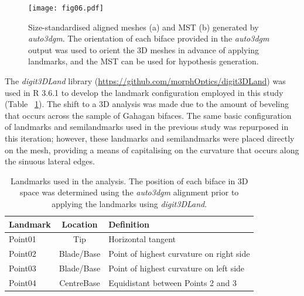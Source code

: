 \documentclass[review]{elsarticle}
\begin{document}
\begin{figure}[ht]\centering
\texttt{[image: fig06.pdf]}
\caption{Size-standardised aligned meshes (a) and MST (b) generated by \textit{auto3dgm}. The orientation of each biface provided in the \textit{auto3dgm} output was used to orient the 3D meshes in advance of applying landmarks, and the MST can be used for hypothesis generation.}
\label{fig:fig06}
\end{figure}

The \textit{digit3DLand} library (\href{https://github.com/morphOptics/digit3DLand}{https://github.com/morphOptics/digit3DLand}) was used in R 3.6.1 \citep{R} to develop the landmark configuration employed in this study (Table ~\ref{tab:Tbl1}). The shift to a 3D analysis was made due to the amount of beveling that occurs across the sample of Gahagan bifaces. The same basic configuration of landmarks and semilandmarks used in the previous study \citep[Figure 3]{RN11783} was repurposed in this iteration; however, these landmarks and semilandmarks were placed directly on the mesh, providing a means of capitalising on the curvature that occurs along the sinuous lateral edges.

\begin{table}[tbh]\centering
\footnotesize
\caption{Landmarks used in the analysis. The position of each biface in 3D space was determined using the \textit{auto3dgm} alignment prior to applying the landmarks using \textit{digit3DLand}.}
\centering
\begin{tabular}{lcp{7.5cm}}
\toprule
Landmark & Location & Definition\\
\midrule
Point01 & Tip & Horizontal tangent\\
Point02 & Blade/Base & Point of highest curvature on right side\\
Point03 & Blade/Base & Point of highest curvature on left side\\
Point04 & CentreBase & Equidistant between Points 2 and 3\\
\bottomrule
\end{tabular}
\label{tab:Tbl1}
\end{table}
\end{document}
